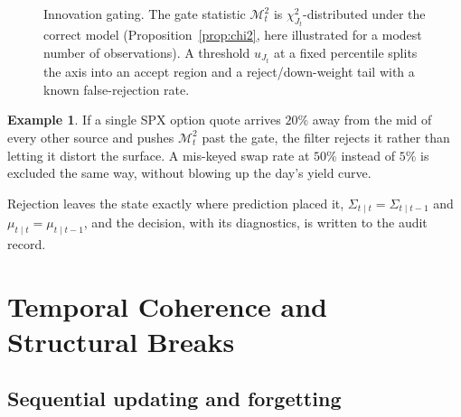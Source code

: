 \documentclass[11pt]{book}
\theoremstyle{plain}
\theoremstyle{definition}
\newtheorem{example}[theorem]{Example}
\theoremstyle{remark}
\begin{document}
\begin{figure}[ht]
\centering
{}
\caption{Innovation gating. The gate statistic $\mathcal{M}_t^2$ is
$\chi^2_{J_t}$-distributed under the correct model (Proposition~\ref{prop:chi2},
here illustrated for a modest number of observations). A threshold $u_{J_t}$ at a
fixed percentile splits the axis into an accept region and a
reject/down-weight tail with a known false-rejection rate.}
\label{fig:gate}
\end{figure}

\begin{example}
If a single SPX option quote arrives $20\%$ away from the mid of every other
source and pushes $\mathcal{M}_t^2$ past the gate, the filter rejects it rather
than letting it distort the surface. A mis-keyed swap rate at $50\%$ instead of
$5\%$ is excluded the same way, without blowing up the day's yield curve.
\end{example}

Rejection leaves the state exactly where prediction placed it,
$\Sigma_{t\mid t}=\Sigma_{t\mid t-1}$ and $\mu_{t\mid t}=\mu_{t\mid t-1}$, and the
decision, with its diagnostics, is written to the audit record.

\section{Temporal Coherence and Structural Breaks}

\subsection{Sequential updating and forgetting}
\end{document}
